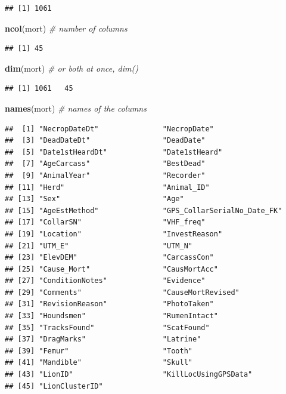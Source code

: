 \documentclass[
]{book}
\newenvironment{Shaded}{\begin{snugshade}}{\end{snugshade}}
\newcommand{\CommentTok}[1]{\textcolor[rgb]{0.56,0.35,0.01}{\textit{#1}}}
\newcommand{\FunctionTok}[1]{\textcolor[rgb]{0.13,0.29,0.53}{\textbf{#1}}}
\newcommand{\NormalTok}[1]{#1}
\begin{document}
\begin{verbatim}
## [1] 1061
\end{verbatim}

\begin{Shaded}
\begin{Highlighting}[]
\FunctionTok{ncol}\NormalTok{(mort) }\CommentTok{\# number of columns}
\end{Highlighting}
\end{Shaded}

\begin{verbatim}
## [1] 45
\end{verbatim}

\begin{Shaded}
\begin{Highlighting}[]
\FunctionTok{dim}\NormalTok{(mort) }\CommentTok{\# or both at once, dim()}
\end{Highlighting}
\end{Shaded}

\begin{verbatim}
## [1] 1061   45
\end{verbatim}

\begin{Shaded}
\begin{Highlighting}[]
\FunctionTok{names}\NormalTok{(mort) }\CommentTok{\# names of the columns}
\end{Highlighting}
\end{Shaded}

\begin{verbatim}
##  [1] "NecropDateDt"               "NecropDate"                
##  [3] "DeadDateDt"                 "DeadDate"                  
##  [5] "Date1stHeardDt"             "Date1stHeard"              
##  [7] "AgeCarcass"                 "BestDead"                  
##  [9] "AnimalYear"                 "Recorder"                  
## [11] "Herd"                       "Animal_ID"                 
## [13] "Sex"                        "Age"                       
## [15] "AgeEstMethod"               "GPS_CollarSerialNo_Date_FK"
## [17] "CollarSN"                   "VHF_freq"                  
## [19] "Location"                   "InvestReason"              
## [21] "UTM_E"                      "UTM_N"                     
## [23] "ElevDEM"                    "CarcassCon"                
## [25] "Cause_Mort"                 "CausMortAcc"               
## [27] "ConditionNotes"             "Evidence"                  
## [29] "Comments"                   "CauseMortRevised"          
## [31] "RevisionReason"             "PhotoTaken"                
## [33] "Houndsmen"                  "RumenIntact"               
## [35] "TracksFound"                "ScatFound"                 
## [37] "DragMarks"                  "Latrine"                   
## [39] "Femur"                      "Tooth"                     
## [41] "Mandible"                   "Skull"                     
## [43] "LionID"                     "KillLocUsingGPSData"       
## [45] "LionClusterID"
\end{verbatim}
\end{document}
